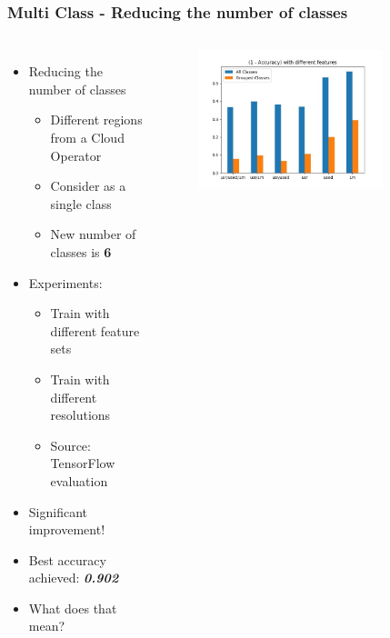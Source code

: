 \documentclass[aspectratio=169,11pt,hyperref={colorlinks=true}]{beamer}
\begin{document}
\begin{frame}
    \frametitle{Multi Class - Reducing the number of classes}
    \begin{columns}
        \begin{itemize}
            \item{Reducing the number of classes}
            \begin{itemize}
                \item{Different regions from a Cloud Operator}
                \item{Consider as a single class}
                \item{New number of classes is \textbf{6}}
            \end{itemize}
            \item{Experiments:}
              \begin{itemize}
                \item{Train with different feature sets}
                \item{Train with different resolutions}
                \item{Source: TensorFlow evaluation}
            \end{itemize}
            \item{Significant improvement!}
            \item{Best accuracy achieved: \emph{\textbf{0.902}}}
            \item{What does that mean?}
        \end{itemize}
        \begin{center}
        \begin{figure}
          \includegraphics[width=0.8\textwidth,height=0.4\textheight]{graphs/multiclass_accuracy_features.jpeg}

\end{figure}
\end{center}
\end{columns}
\end{frame}
\end{document}
